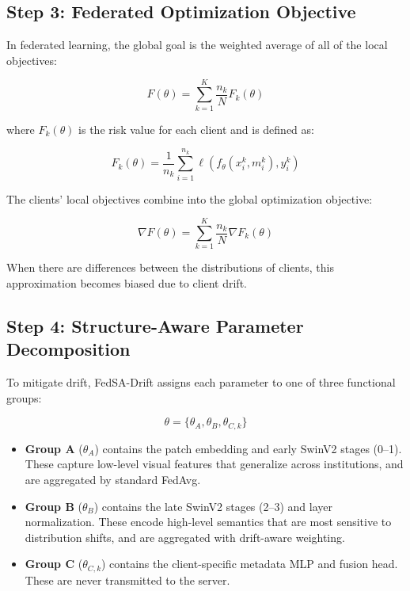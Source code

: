 \documentclass{ieeeaccess}
\newcommand{\sadrift}{FedSA-Drift}
\begin{document}
\subsection{Step 3: Federated Optimization Objective}

In federated learning, the global goal is the weighted average of all of the local objectives:

\begin{equation}
\label{eq:fed_objective}
F(\theta) = \sum_{k=1}^{K} \frac{n_k}{N} F_k(\theta)
\end{equation}

where $F_k(\theta)$ is the risk value for each client and is defined as:

\begin{equation}
\label{eq:local_risk}
F_k(\theta) = \frac{1}{n_k} \sum_{i=1}^{n_k} \ell(f_\theta(x_i^k,m_i^k), y_i^k)
\end{equation}

The clients' local objectives combine into the global optimization objective:

\begin{equation}
\label{eq:fed_gradient}
\nabla F(\theta) = \sum_{k=1}^{K} \frac{n_k}{N} \nabla F_k(\theta)
\end{equation}

When there are differences between the distributions of clients, this approximation becomes biased due to client drift.

\subsection{Step 4: Structure-Aware Parameter Decomposition}

To mitigate drift, \sadrift{} assigns each parameter to one of three functional groups:

\begin{equation}
\label{eq:param_decomp}
\theta = \{\theta_A, \theta_B, \theta_{C,k}\}
\end{equation}

\begin{itemize}
\item \textbf{Group A} ($\theta_A$) contains the patch embedding and early SwinV2 stages (0--1). These capture low-level visual features that generalize across institutions, and are aggregated by standard FedAvg.
\item \textbf{Group B} ($\theta_B$) contains the late SwinV2 stages (2--3) and layer normalization. These encode high-level semantics that are most sensitive to distribution shifts, and are aggregated with drift-aware weighting.
\item \textbf{Group C} ($\theta_{C,k}$) contains the client-specific metadata MLP and fusion head. These are never transmitted to the server.
\end{itemize}
\end{document}
